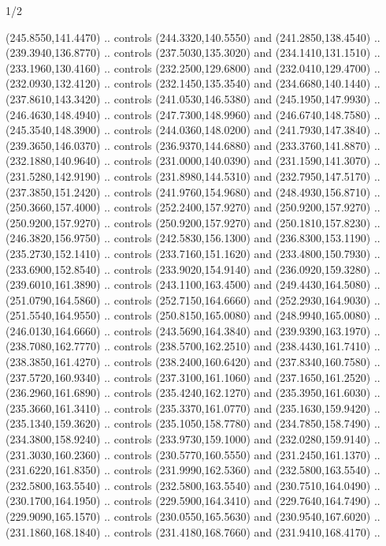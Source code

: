 \begin{flagdescription}{1/2}
\begin{scope}[xshift=0.5\flaglength]
\begin{scope}[scale=0.004\flagwidth,xshift=-90mm,yshift=89mm]
\begin{scope}[y=0.80pt, x=0.80pt, yscale=-1, xscale=1, inner sep=0pt, outer sep=0pt]
  (245.8550,141.4470) .. controls (244.3320,140.5550) and (241.2850,138.4540) ..
  (239.3940,136.8770) .. controls (237.5030,135.3020) and (234.1410,131.1510) ..
  (233.1960,130.4160) .. controls (232.2500,129.6800) and (232.0410,129.4700) ..
  (232.0930,132.4120) .. controls (232.1450,135.3540) and (234.6680,140.1440) ..
  (237.8610,143.3420) .. controls (241.0530,146.5380) and (245.1950,147.9930) ..
  (246.4630,148.4940) .. controls (247.7300,148.9960) and (246.6740,148.7580) ..
  (245.3540,148.3900) .. controls (244.0360,148.0200) and (241.7930,147.3840) ..
  (239.3650,146.0370) .. controls (236.9370,144.6880) and (233.3760,141.8870) ..
  (232.1880,140.9640) .. controls (231.0000,140.0390) and (231.1590,141.3070) ..
  (231.5280,142.9190) .. controls (231.8980,144.5310) and (232.7950,147.5170) ..
  (237.3850,151.2420) .. controls (241.9760,154.9680) and (248.4930,156.8710) ..
  (250.3660,157.4000) .. controls (252.2400,157.9270) and (250.9200,157.9270) ..
  (250.9200,157.9270) .. controls (250.9200,157.9270) and (250.1810,157.8230) ..
  (246.3820,156.9750) .. controls (242.5830,156.1300) and (236.8300,153.1190) ..
  (235.2730,152.1410) .. controls (233.7160,151.1620) and (233.4800,150.7930) ..
  (233.6900,152.8540) .. controls (233.9020,154.9140) and (236.0920,159.3280) ..
  (239.6010,161.3890) .. controls (243.1100,163.4500) and (249.4430,164.5080) ..
  (251.0790,164.5860) .. controls (252.7150,164.6660) and (252.2930,164.9030) ..
  (251.5540,164.9550) .. controls (250.8150,165.0080) and (248.9940,165.0080) ..
  (246.0130,164.6660) .. controls (243.5690,164.3840) and (239.9390,163.1970) ..
  (238.7080,162.7770) .. controls (238.5700,162.2510) and (238.4430,161.7410) ..
  (238.3850,161.4270) .. controls (238.2400,160.6420) and (237.8340,160.7580) ..
  (237.5720,160.9340) .. controls (237.3100,161.1060) and (237.1650,161.2520) ..
  (236.2960,161.6890) .. controls (235.4240,162.1270) and (235.3950,161.6030) ..
  (235.3660,161.3410) .. controls (235.3370,161.0770) and (235.1630,159.9420) ..
  (235.1340,159.3620) .. controls (235.1050,158.7780) and (234.7850,158.7490) ..
  (234.3800,158.9240) .. controls (233.9730,159.1000) and (232.0280,159.9140) ..
  (231.3030,160.2360) .. controls (230.5770,160.5550) and (231.2450,161.1370) ..
  (231.6220,161.8350) .. controls (231.9990,162.5360) and (232.5800,163.5540) ..
  (232.5800,163.5540) .. controls (232.5800,163.5540) and (230.7510,164.0490) ..
  (230.1700,164.1950) .. controls (229.5900,164.3410) and (229.7640,164.7490) ..
  (229.9090,165.1570) .. controls (230.0550,165.5630) and (230.9540,167.6020) ..
  (231.1860,168.1840) .. controls (231.4180,168.7660) and (231.9410,168.4170) ..

\end{scope}
\end{scope}
\end{scope}
\end{flagdescription}

